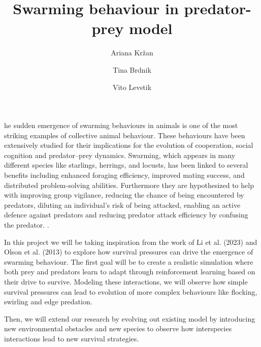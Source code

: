 \documentclass[9pt]{pnas-new}
\title{Swarming behaviour in predator-prey model}
\author{Ariana Kržan}
\author{Tina Brdnik}
\author{Vito Levstik}
\affil{Collective behaviour course research seminar report}
\begin{document}
\verticaladjustment{-2pt}

\maketitle
\thispagestyle{firststyle}

he sudden emergence of swarming behaviours in animals is one of the most striking examples of collective animal behaviour. These behaviours have been extensively studied for their implications for the evolution of cooperation, social cognition and predator–prey dynamics\cite{olson2013predator}. Swarming, which appears in many different species like starlings, herrings, and locusts, has been linked to several benefits including enhanced foraging efficiency, improved mating success, and distributed problem-solving abilities. Furthermore they are hypothesized to help with improving group vigilance, reducing the chance of being encountered by predators, diluting an individual's risk of being attacked, enabling an active defence against predators and reducing predator attack efficiency by confusing the predator. \cite{li2023predator}.

In this project we will be taking inspiration from the work of Li et al. (2023) and Olson et al. (2013) to explore how survival pressures can drive the emergence of swarming behaviour. The first goal will be to create a realistic simulation where both prey and predators learn to adapt through reinforcement learning based on their drive to survive. Modeling these interactions, we will observe how simple survival pressures can lead to evolution of more complex behaviours like flocking, swirling and edge predation. 

Then, we will extend our research by evolving out existing model by introducing new environmental obstacles and new species to observe how interspecies interactions lead to new survival strategies.
\end{document}
